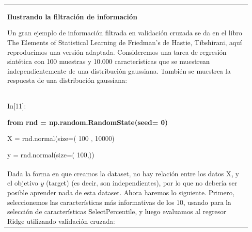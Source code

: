    \begin{longtable}{|p{13.25cm}|}  
      
      
      \arrayrulecolor{red}\hline
      
      \begin{center}
         {\bf{Ilustrando la filtración de información}}
      \end{center}
      
      \endfirsthead
      
      Un gran ejemplo de información filtrada en validación cruzada se da en  el libro  The Elements of Statistical Learning  de  Friedman’s  de  Hastie,   Tibshirani,  aquí reproducimos una versión adaptada.    Consideremos una tarea de regresión sintética con 100 muestras y 10.000 características
		que se muestrean independientemente de una distribución gaussiana. También se muestrea
		la respuesta de una distribución gaussiana:       \\
		
		
		{ \ttfamily   
			{\scriptsize{  	
					
	            In[11]:
               \vspace{0.1cm}
               
     
   
            {\color{blue}   {\textbf
          {\hspace{0.6cm}from  rnd = np.random.RandomState(seed={\color{red} 0})}
                     
           \hspace{0.6cm}X = rnd.normal(size=({\color{red}  100 }, {\color{red}  10000})    \vspace{-0.2cm} 
                     
           \hspace{0.6cm}y = rnd.normal(size=({\color{red} 100},))  
      }  }}}}\\       
      
      \vspace{-0.251cm}
      
      
      Dada la forma en que creamos la dataset, no hay relación entre los datos   X,  y  el
      objetivo $y$ (target)  (es decir, son independientes), por lo que no debería ser posible aprender nada de  esta  dataset. Ahora haremos lo siguiente. Primero, seleccionemos las  características  más informativas de los 10,   usando para la selección de características {\ttfamily SelectPercentile}, y
   	luego evaluamos al regresor Ridge   utilizando validación cruzada: \\  
		

\end{longtable}
